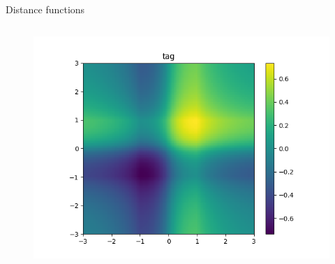 \begin{frame}{\tciii{} Distance functions}
\begin{columns}
\begin{column}{0.35\linewidth}
\begin{figure}
\centering
\includegraphics[width=\linewidth]{images/GENE/images/distance_tag.png}
\end{figure}
\end{column}
\end{columns}

\end{frame}


